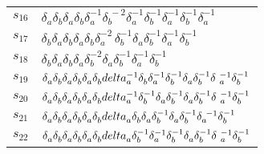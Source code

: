 \documentclass{article}
\begin{document}
\begin{center}
\begin{tabular}{ll}
$s_{16}$ & $\delta_a^{}\delta_b^{}\delta_a^{}\delta_b^{}\delta_a^{-1}\delta_b^{\
-2}\delta_a^{-1}\delta_b^{-1}\delta_a^{-1}\delta_b^{-1}\delta_a^{-1}$ \\
$s_{17}$ & $\delta_b^{}\delta_a^{}\delta_b^{}\delta_a^{}\delta_b^{}\delta_a^{-2\
}\delta_b^{-1}\delta_a^{}\delta_b^{-1}\delta_a^{-1}\delta_b^{-1}$ \\
$s_{18}$ & $\delta_b^{}\delta_a^{}\delta_b^{}\delta_a^{}\delta_b^{-2}\delta_a^{\
}\delta_b^{-1}\delta_a^{-1}\delta_b^{-1}$ \\
$s_{19}$ & $\delta_a^{}\delta_b^{}\delta_a^{}\delta_b^{}\delta_a^{}\delta_b^{}\\
delta_a^{-1}\delta_b^{}\delta_a^{-1}\delta_b^{-1}\delta_a^{}\delta_b^{-1}\delta\
_a^{-1}\delta_b^{-1}$ \\
$s_{20}$ & $\delta_a^{}\delta_b^{}\delta_a^{}\delta_b^{}\delta_a^{}\delta_b^{}\\
delta_a^{-1}\delta_b^{-1}\delta_a^{}\delta_b^{-1}\delta_a^{}\delta_b^{-1}\delta\
_a^{-1}\delta_b^{-1}$ \\
$s_{21}$ & $\delta_a^{}\delta_b^{}\delta_a^{}\delta_b^{}\delta_a^{}\delta_b^{}\\
delta_a^{}\delta_b^{}\delta_a^{}\delta_b^{-1}\delta_a^{}\delta_b^{-1}\delta_a^{\
-1}\delta_b^{-1}$ \\
$s_{22}$ & $\delta_a^{}\delta_b^{}\delta_a^{}\delta_b^{}\delta_a^{}\delta_b^{}\\
delta_a^{}\delta_b^{-1}\delta_a^{-1}\delta_b^{-1}\delta_a^{}\delta_b^{-1}\delta\
_a^{-1}\delta_b^{-1}$ \\
\bottomrule
\end{tabular}
\end{center}

\thispagestyle{empty}
\end{document}

